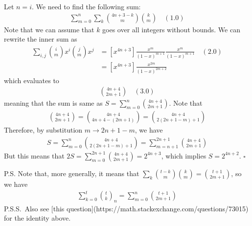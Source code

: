 ﻿Let $n=i$.
We need to find the following sum:
\begin{align*}
\sum\limits_{m=0}^n \sum\limits_k\binom{4n+3-k}{m}\binom{k}{m} \quad (1.0)
\end{align*}
Note that we can assume that $k$ goes over all integers without bounds.
We can rewrite the inner sum as
\begin{align*}
[x^{4n+3}]
    \sum\limits_{i,j} \binom{i}{m} x^i \binom{j}{m} x^j &= [x^{4n+3}] \frac{x^m}{(1-x)^{m+1}} \frac{x^m}{(1-x)^{m+1}} \quad (2.0) \\
    &= [x^{4n+3}] \frac{x^{2m}}{(1-x)^{2m+2}}
\end{align*}
which evaluates to
\begin{align*}
    \binom{4n+4}{2m+1} \quad (3.0)
\end{align*}
meaning that the sum is same as $S=\sum\limits_{m=0}^n \binom{4n+4}{2m+1}$.
Note that
\begin{align*}
    \binom{4n+4}{2m+1} = \binom{4n+4}{4n+4-(2m+1)} = \binom{4n+4}{2(2n+1-m)+1}
\end{align*}
Therefore, by substitution $m \to 2n+1-m$, we have
\begin{align*}
    S =\sum\limits_{m=0}^n \binom{4n+4}{2(2n+1-m)+1} = \sum\limits_{m=n+1}^{2n+1} \binom{4n+4}{2m+1}
\end{align*}
But this means that $2S = \sum\limits_{m=0}^{2n+1} \binom{4n+4}{2m+1} =2^{4n+3}$, which implies $S = 2^{4n+2}$. $\square$

P.S. Note that, more generally, it means that $\sum\limits_k  \binom{t-k}{m} \binom{k}{m} = \binom{t+1}{2m+1}$, so we have
\begin{align*}
    \sum\limits_{k=0}^t \binom{t}{k}_n = \sum\limits_{m=0}^n \binom{t+1}{2m+1}
\end{align*}
P.S.S.\ Also see [this question](https://math.stackexchange.com/questions/73015) for the identity above.
